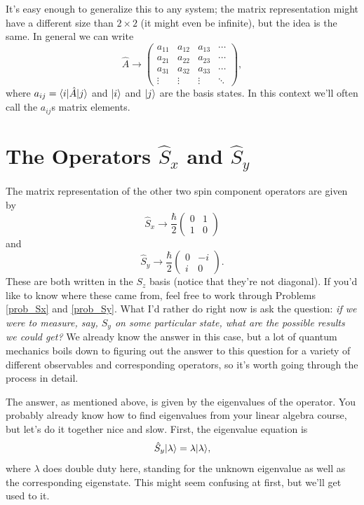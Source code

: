 It's easy enough to generalize this to any system; the matrix representation might have a different size than $2 \times 2$ (it might even be infinite), but the idea is the same.  In general we can write
\begin{equation}
\hat{A} \to \begin{pmatrix} 
a_{11} & a_{12} & a_{13} & \cdots \\ 
a_{21} & a_{22} & a_{23} & \cdots \\
a_{31} & a_{32} & a_{33} & \cdots \\
\vdots & \vdots & \vdots  & \ddots
\end{pmatrix},
\end{equation}
where $a_{ij} = \langle i | \hat{A} | j \rangle$ and $| i \rangle$ and $| j \rangle$ are the basis states.  In this context we'll often call the $a_{ij}$s matrix elements.


\section{The Operators $\hat{S}_x$ and $\hat{S}_y$}
\label{sec_Sx_Sy}

The matrix representation of the other two spin component operators are given by
\begin{equation}
\label{eq_sx_matrix}
\hat{S}_x \to \frac{\hbar}{2} \begin{pmatrix} 0 & 1 \\ 1 & 0 \end{pmatrix}
\end{equation}
and 
\begin{equation}
\label{eq_sy_matrix}
\hat{S}_y \to \frac{\hbar}{2} \begin{pmatrix} 0 & -i \\ i & 0 \end{pmatrix}.
\end{equation}
These are both written in the $S_z$ basis (notice that they're not diagonal).  If you'd like to know where these came from, feel free to work through Problems \ref{prob_Sx} and \ref{prob_Sy}.  What I'd rather do right now is ask the question: \emph{if we were to measure, say, $S_y$ on some particular state, what are the possible results we could get?}  We already know the answer in this case, but a lot of quantum mechanics boils down to figuring out the answer to this question for a variety of different observables and corresponding operators, so it's worth going through the process in detail.

The answer, as mentioned above, is given by the eigenvalues of the operator. You probably already know how to find eigenvalues from your linear algebra course, but let's do it together nice and slow.  First, the eigenvalue equation is
\begin{equation}
\label{eq_eigeny}
\hat{S}_y | \lambda \rangle = \lambda | \lambda \rangle,
\end{equation}
where $\lambda$ does double duty here, standing for the unknown eigenvalue as well as the corresponding eigenstate.  This might seem confusing at first, but we'll get used to it. 

